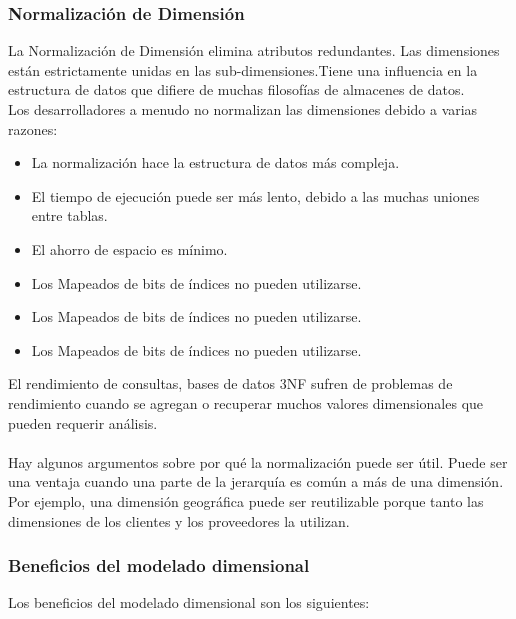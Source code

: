 \documentclass[11pt,a4paper]{article}
\begin{document}
		\subsubsection{Normalización de Dimensión}
		La Normalización de Dimensión elimina atributos redundantes. Las dimensiones están estrictamente unidas en las sub-dimensiones.Tiene una influencia en la estructura de datos que difiere de muchas filosofías de almacenes de datos.\\
		Los desarrolladores a menudo no normalizan las dimensiones debido a varias razones:
		\begin{itemize}
			\item La normalización hace la estructura de datos más compleja.
			\item El tiempo de ejecución puede ser más lento, debido a las muchas uniones entre tablas.
			\item El ahorro de espacio es mínimo.
			\item Los Mapeados de bits de índices no pueden utilizarse.
			\item Los Mapeados de bits de índices no pueden utilizarse.
			\item Los Mapeados de bits de índices no pueden utilizarse.
		\end{itemize}

El rendimiento de consultas, bases de datos 3NF sufren de problemas de rendimiento cuando se agregan o recuperar muchos valores dimensionales que pueden requerir análisis.\\
		\\
		Hay algunos argumentos sobre por qué la normalización puede ser útil. Puede ser una ventaja cuando una parte de la jerarquía es común a más de una dimensión. Por ejemplo, una dimensión geográfica puede ser reutilizable porque tanto las dimensiones de los clientes y los proveedores la utilizan.
		
	 	
	 	\subsubsection{Beneficios del modelado dimensional}
	 	
	 	Los beneficios del modelado dimensional son los siguientes:
	 	
\end{document}
